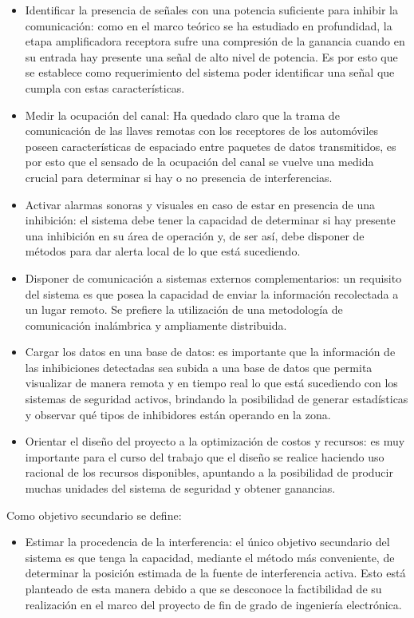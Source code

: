 \begin{itemize}
    \item Identificar la presencia de señales con una potencia suficiente para inhibir la comunicación: como en el marco teórico se ha 
    estudiado en profundidad, la etapa amplificadora receptora sufre una compresión de la ganancia cuando en su entrada hay presente 
    una señal de alto nivel de potencia. Es por esto que se establece como requerimiento del sistema poder identificar una señal que cumpla con
    estas características.
    \item Medir la ocupación del canal: Ha quedado claro que la trama de comunicación de las llaves remotas con los receptores de los automóviles 
    poseen características de espaciado entre paquetes de datos transmitidos, es por esto que el sensado de la ocupación del canal se vuelve 
    una medida crucial para determinar si hay o no presencia de interferencias.
    \item Activar alarmas sonoras y visuales en caso de estar en presencia de una inhibición: el sistema debe tener la capacidad de determinar 
    si hay presente una inhibición en su área de operación y, de ser así, debe disponer de métodos para dar alerta local de lo que está sucediendo.
    \item Disponer de comunicación a sistemas externos complementarios: un requisito del sistema es que posea la capacidad de enviar la información recolectada
    a un lugar remoto. Se prefiere la utilización de una metodología de comunicación inalámbrica y ampliamente distribuida.
    \item Cargar los datos en una base de datos: es importante que la información de las inhibiciones detectadas sea subida a una base de datos
    que permita visualizar de manera remota y en tiempo real lo que está sucediendo con los sistemas de seguridad activos, brindando la posibilidad 
    de generar estadísticas y observar qué tipos de inhibidores están operando en la zona.
    \item Orientar el diseño del proyecto a la optimización de costos y recursos: es muy importante para el curso del trabajo que el diseño 
    se realice haciendo uso racional de los recursos disponibles, apuntando a la posibilidad de producir muchas unidades del sistema de seguridad
    y obtener ganancias.

\end{itemize}

Como objetivo secundario se define:

\begin{itemize}
    \item Estimar la procedencia de la interferencia: el único objetivo secundario del sistema es que tenga la capacidad, mediante el método 
    más conveniente, de determinar la posición estimada de la fuente de interferencia activa. Esto está planteado de esta manera debido a que 
    se desconoce la factibilidad de su realización en el marco del proyecto de fin de grado de ingeniería electrónica.
\end{itemize}


